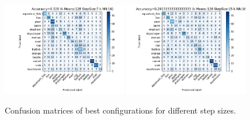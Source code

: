 \documentclass[12pt]{article}
\begin{document}
\begin{itemize}
\begin{figure}[!h]
		\end{figure}
        \begin{figure}[!h]
			\centering
			\includegraphics[width=0.48\textwidth]{Figure_1-4.png}
			\includegraphics[width=0.48\textwidth]{Figure_1-5.png}
			\caption{Confusion matrices of best configurations for different step sizes.}
		\end{figure}
		
    \end{itemize}
\pagebreak
\end{document}
